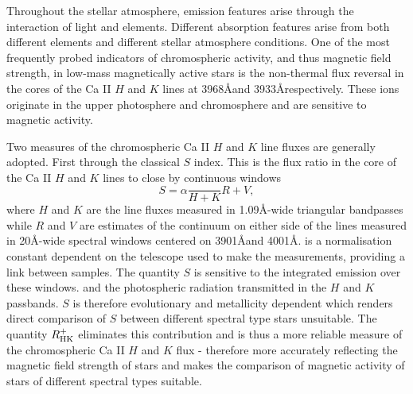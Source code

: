 Throughout the stellar atmosphere, emission features arise through the interaction of light and elements. 
Different absorption features arise from both different elements and different stellar atmosphere conditions.
One of the most frequently probed indicators of chromospheric activity, and thus magnetic field strength, in low-mass magnetically active stars is the non-thermal flux reversal in the cores of the Ca II $H$ and $K$ lines at 3968\AA and 3933\AA respectively.
These ions originate in the upper photosphere and chromosphere and are sensitive to magnetic activity.


Two measures of the chromospheric Ca II $H$ and $K$ line fluxes are generally adopted.
First through the classical $S$ index.
This is the flux ratio in the core of the Ca II $H$ and $K$ lines to close by continuous windows
\begin{equation}
S = \alpha \frac{}{H+K}{R+V},
\end{equation}
where $H$ and $K$ are the line fluxes measured in 1.09\AA-wide triangular bandpasses while $R$ and $V$ are estimates of the continuum on either side of the lines measured in 20\AA-wide spectral windows centered on 3901\AA and 4001\AA. 
\alpha is a normalisation constant dependent on the telescope used to make the measurements, providing a link between samples.
The quantity $S$ is sensitive to the integrated emission over these windows. and the photospheric radiation transmitted in the $H$ and $K$ passbands. 
$S$ is therefore evolutionary and metallicity dependent which renders direct comparison of $S$ between different spectral type stars unsuitable.
The quantity $R_{\rm{HK}}^{+}$ eliminates this contribution \citep[See]{citeme} and is thus a more reliable measure of the chromospheric Ca II $H$ and $K$ flux - therefore more accurately reflecting the magnetic field strength of stars and makes the comparison of magnetic activity of stars of different spectral types suitable.

